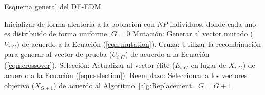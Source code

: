 \begin{algorithm}[t]
  \scriptsize
	\caption{Esquema general del DE-EDM} 
	\begin{algorithmic}[1]
	\STATE Inicializar de forma aleatoria a la población con $NP$ individuos, donde cada uno es distribuido de forma uniforme.
	\STATE $G=0$
		\STATE Mutación: Generar al vector mutado ($V_{i,G}$) de acuerdo a la Ecuación (\ref{eqn:mutation}).
		\STATE Cruza: Utilizar la recombinación para generar al vector de prueba ($U_{i,G}$) de acuerdo a la Ecuación (\ref{eqn:crossover}).
		\STATE Selección: Actualizar al vector élite ($E_{i,G}$ en lugar de $X_{i,G}$) de acuerdo a la Ecuación (\ref{eqn:selection}).
	   \ENDFOR
		\STATE Reemplazo: Seleccionar a los vectores objetivo ($X_{G+1}$) de acuerdo al Algoritmo~\ref{alg:Replacement}.
	   \STATE $G=G+1$
	\ENDWHILE
\end{algorithmic}
    \label{alg:DEEDM}
\end{algorithm}


